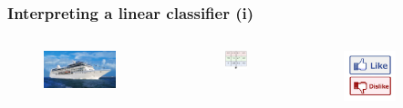 \begin{frame}
	\frametitle{Interpreting a linear classifier (i)}

	\begin{columns}
	
        	\begin{figure}
                	\includegraphics[width=0.8\textwidth]{Pics/ship.jpg}
        	\end{figure}

		\begin{figure}
                        \includegraphics[width=0.8\textwidth]{Pics/W.png}
                \end{figure}
                \begin{figure}
                        \includegraphics[width=0.6\textwidth]{Pics/like.jpg}
                \end{figure}


		
	\end{columns}

\end{frame}


